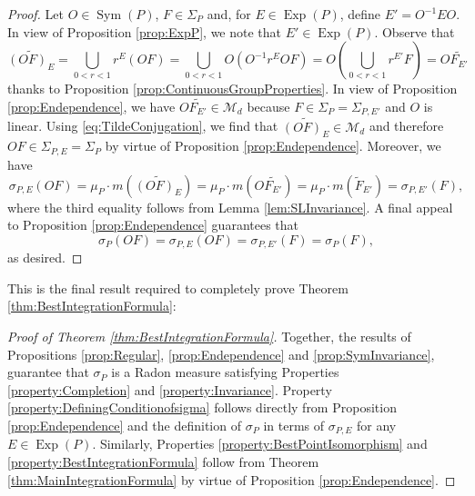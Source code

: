 \documentclass[11pt, letter]{book}
\newcommand\Sym{\operatorname{Sym}}
\newcommand\Exp{\operatorname{Exp}}
\begin{document}
\begin{proof}
Let $O\in\Sym(P)$, $F\in\Sigma_P$ and, for $E\in \Exp(P)$, define $E'=O^{-1} EO$. In view of Proposition \ref{prop:ExpP}, we note that $E'\in \Exp(P)$. Observe that
\begin{equation}\label{eq:TildeConjugation}
    \widetilde{(OF)_E}=\bigcup_{0<r<1}r^E (OF)=\bigcup_{0<r<1}O\left(O^{-1} r^E O F\right)=O\left(\bigcup_{0<r<1} r^{E'}F\right)=O \widetilde{F_{E'}}
\end{equation}
thanks to Proposition \ref{prop:ContinuousGroupProperties}.
In view of Proposition \ref{prop:Endependence}, we have $O\widetilde{F_{E'}}\in \mathcal{M}_d$ because $F\in \Sigma_P=\Sigma_{P,E'}$ and $O$ is linear. Using \eqref{eq:TildeConjugation}, we find that $\widetilde{(OF)_E}\in\mathcal{M}_d$ and therefore  $OF\in\Sigma_{P,E}=\Sigma_P$ by virtue of Proposition \ref{prop:Endependence}. Moreover, we have
\begin{equation*}
\sigma_{P,E}(OF)=\mu_P\cdot m\left(\widetilde{(OF)_E}\right)=\mu_P\cdot m\left(O \widetilde{F_{E'}}\right)=\mu_P\cdot m\left(\widetilde{F}_{E'}\right)=\sigma_{P,E'}(F),
\end{equation*}
where the third equality follows from Lemma \ref{lem:SLInvariance}. A final appeal to Proposition \ref{prop:Endependence} guarantees that
\begin{equation*}
    \sigma_P(OF)=\sigma_{P,E}(OF)=\sigma_{P,E'}(F)=\sigma_P(F),
\end{equation*}
as desired.
\end{proof}



\noindent This is the final result required to completely prove Theorem \ref{thm:BestIntegrationFormula}:



\begin{proof}[Proof of Theorem \ref{thm:BestIntegrationFormula}]
Together, the results of Propositions \ref{prop:Regular}, \ref{prop:Endependence} and \ref{prop:SymInvariance}, guarantee that $\sigma_P$ is a Radon measure satisfying Properties \ref{property:Completion} and \ref{property:Invariance}. Property \ref{property:DefiningConditionofsigma} follows directly from Proposition \ref{prop:Endependence} and the definition of $\sigma_P$ in terms of $\sigma_{P,E}$ for any $E\in\Exp(P)$. Similarly, Properties \ref{property:BestPointIsomorphism} and \ref{property:BestIntegrationFormula} follow from Theorem \ref{thm:MainIntegrationFormula} by virtue of Proposition \ref{prop:Endependence}. 
\end{proof}
\end{document}
